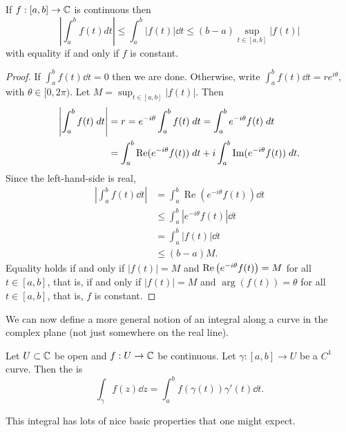 \documentclass[a4paper]{scrartcl}
\begin{document}
\begin{proposition}
    If $f: [a, b] \rightarrow \mathbb{C}$ is continuous then
    $$
    \left|\int_{a}^{b} f(t) d t\right| \leq \int_{a}^{b}|f(t)| \dd t \leq(b-a) \sup _{t \in[a, b]}|f(t)|
    $$
    with equality if and only if $f$ is constant.
\end{proposition}
\begin{proof}
    If $\int_a^b f(t) \dd t = 0$ then we are done. Otherwise, write $\int_a^b f(t) \dd t = re^{i \theta}$, with $\theta \in [0, 2\pi)$. Let $M = \sup_{t \in [a, b]} |f(t)|$. Then
    \begin{align*}
        \left|\int_a^b f(t) \; d t\right| &= r = e^{-i \theta} \int_a^b f(t) \; d t = \int_a^b e^{-i \theta} f(t) \; d t \\
        &= \int_a^b \operatorname{Re}(e^{-i \theta} f(t)) \; d t + i \int_a^b \operatorname{Im}(e^{- i \theta} f(t)) \; d t.
    \end{align*}
    Since the left-hand-side is real,
    \begin{align*}
        \left|\int_{a}^{b} f(t) \dd t\right|&=\int_{a}^{b} \operatorname{Re}\left(e^{-i \theta} f(t)\right) \dd t \\
        &\leq \int_{a}^{b}\left|e^{-i \theta} f(t)\right| \dd t \\
        &= \int_a^b |f(t)| \dd t \\
        & \leq (b - a) M.
    \end{align*}
    Equality holds if and only if $|f(t)|=M$ and $\operatorname{Re}\left(e^{-i \theta} f(t)\right)=M$ for all $t \in[a, b]$, that is, if and only if $|f(t)|=M$ and $\arg (f(t))=\theta$ for all $t \in[a, b]$, that is, $f$ is constant.
\end{proof}

We can now define a more general notion of an integral along a curve in the complex plane (not just somewhere on the real line).

\begin{definition}
    Let $U \subset \mathbb{C}$ be open and $f: U \rightarrow \mathbb{C}$ be continuous. Let $\gamma: [a, b]  \rightarrow U$ be a $C^1$ curve. Then the  is
    $$
    \int_{\gamma} f(z) \dd z = \int_a^b f(\gamma(t)) \gamma'(t) \dd t.
    $$
\end{definition}

This integral has lots of nice basic properties that one might expect.
\end{document}

